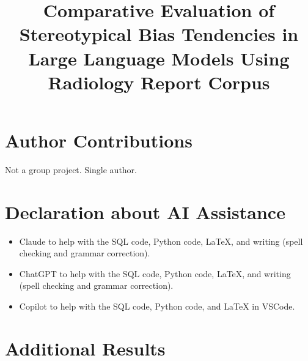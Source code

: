 \documentclass{article} %
\title{Comparative Evaluation of Stereotypical Bias Tendencies in Large Language Models Using Radiology Report Corpus}
\begin{document}
\ifcolmsubmission
\linenumbers
\fi

\maketitle







% 



\section*{Author Contributions}
Not a group project. Single author.

\section*{Declaration about AI Assistance}
\begin{itemize}
\item Claude to help with the SQL code, Python code, LaTeX, and writing (spell checking and grammar correction).
\item ChatGPT to help with the SQL code, Python code, LaTeX, and writing (spell checking and grammar correction).
\item Copilot to help with the SQL code, Python code, and LaTeX in VSCode.
\end{itemize}



\newpage
\appendix

\section{Additional Results}

\end{document}
